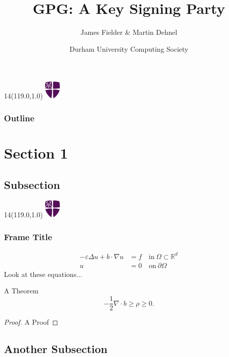 \documentclass[xcolor=dvipsnames,usepdftitle=false]{beamer}
\title[GPG Key Signing Party]{GPG: A Key Signing Party}
\author{James Fielder \& Martin Dehnel}
\institute[Durham]{}
\date[14 May 2012]{Durham University Computing Society}
\institute[Durham]{\includegraphics[height=1.5cm]{pictures/logo_purple.eps}}
\newcommand{\MyLogo}{%
	\begin{textblock}{14}(119.0,1.0) %
		\includegraphics[width=0.8cm]{pictures/logo_only.eps}
	\end{textblock}
}
\renewcommand\epsilon{\varepsilon}
\newcommand{\pO}{{\partial \Omega}}
\newcommand{\half}[0]{\ensuremath{\frac{1}{2}}}
\begin{document}
\frame[plain]{\titlepage}

\begin{frame}
	\MyLogo
	\frametitle{Outline}
	\tableofcontents
\end{frame}

\section{Section 1}

\subsection*{Subsection} %

\begin{frame}
	\MyLogo
	\frametitle{Frame Title}
	\begin{equation} 
		\begin{split}
		-\epsilon \Delta u + b \cdot \nabla u & = f  \quad \mathrm{in}~ \Omega \subset \mathbb{R}^d  \nonumber\\
		u & = 0   \quad \mathrm{on}~ \pO \nonumber
		\end{split}
	\end{equation}
	Look at these equations...

	\begin{theorem}
		A Theorem
		\begin{equation}
			- \half \nabla \cdot b \ge \rho \ge 0. \nonumber
		\end{equation}
	\end{theorem}
	\begin{proof}
		A Proof
	\end{proof}

\end{frame}

\subsection*{Another Subsection}
\end{document}
